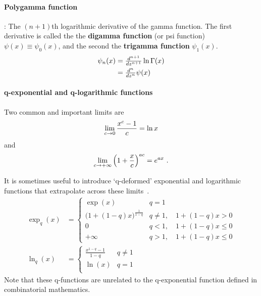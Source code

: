 \paragraph*{Polygamma function}\hspace{-0.8em}\cite{Abramowitz1965}:
The $(n+1)$th logarithmic derivative of the gam\-ma function. The first derivative is called the 
the {\bf digamma function} (or psi function) $\psi(x)\equiv\psi_0(x)$, and the second the {\bf trigamma function} $\psi_1(x)$.
\begin{align*}
	\psi_n(x)&= \tfrac{d^{n+1}}{dz^{n+1}} \ln \Gamma(x) 	
	\\ &=  \tfrac{d^{n}}{dz^{n}} \psi(x) 					
\end{align*}



\paragraph*{q-exponential and q-logarithmic functions}
Two common and important limits are
\[
\lim_{c\rightarrow0} \frac{x^c -1}{c} = \ln x
\notag 
\]
and
\[
\lim_{c\rightarrow+\infty} \left(1 + \frac{x}{c} \right)^{a c} = e^{a x} \ . 
\notag
\]



It is sometimes useful to introduce `q-deformed' exponential and logarithmic functions that extrapolate across these limits~\cite{Tsallis1994,Yamano2002}.
\begin{align*}
\exp_q(x) &=  
\begin{cases}
\exp(x) & q= 1 \\
\bigl(1+ (1-q) x \bigr)^{\frac{1}{1-q} }& q\neq 1, \quad 1+(1-q)x>0 \\
0 & q< 1, \quad 1+(1-q)x\leq0 \\
+\infty & q> 1, \quad 1+(1-q)x\leq0 
\end{cases}
\\
\ln_q(x) &=  
\begin{cases}
\frac{x^{1-q} -1}{1-q}& q\neq 1\\
\ln(x) & q= 1 \\
\end{cases}
\end{align*}
Note that these q-functions  are unrelated to the q-exponential function defined in combinatorial mathematics.


